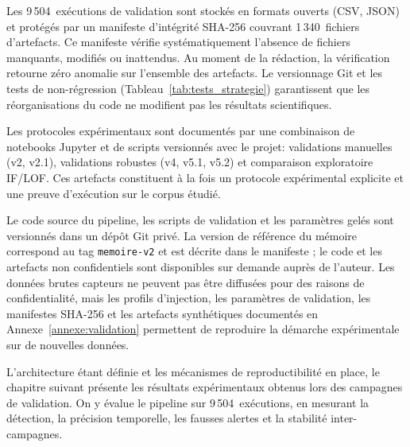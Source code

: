 Les 9\,504~exécutions de validation sont stockés en formats ouverts (CSV, JSON) et
protégés par un manifeste d'intégrité SHA-256 couvrant 1\,340~fichiers d'artefacts. Ce
manifeste vérifie systématiquement l'absence de fichiers manquants, modifiés ou
inattendus. Au moment de la rédaction, la vérification retourne zéro anomalie sur
l'ensemble des artefacts. Le versionnage Git et les tests de non-régression
(Tableau~\ref{tab:tests_strategie}) garantissent que les réorganisations du code ne
modifient pas les résultats scientifiques.

Les protocoles expérimentaux sont documentés par une combinaison de notebooks Jupyter et
de scripts versionnés avec le projet: validations manuelles (v2, v2.1), validations
robustes (v4, v5.1, v5.2) et comparaison exploratoire IF/LOF. Ces artefacts constituent
à la fois un protocole expérimental explicite et une preuve d'exécution sur le corpus
étudié.

Le code source du pipeline, les scripts de validation et les paramètres gelés sont
versionnés dans un dépôt Git privé. La version de référence du mémoire correspond au
tag \texttt{memoire-v2} et est décrite dans le manifeste
 ; le code et les artefacts non
confidentiels sont disponibles sur demande auprès de l'auteur. Les données brutes
capteurs ne peuvent pas être diffusées pour des raisons de confidentialité, mais les
profils d'injection, les paramètres de validation, les manifestes SHA-256 et les artefacts
synthétiques documentés en Annexe~\ref{annexe:validation} permettent de reproduire la
démarche expérimentale sur de nouvelles données.

\vspace{0.5em}
\noindent
L'architecture étant définie et les mécanismes de reproductibilité en place, le chapitre
suivant présente les résultats expérimentaux obtenus lors des campagnes de validation. On y
évalue le pipeline sur 9\,504~exécutions, en mesurant la détection, la précision
temporelle, les fausses alertes et la stabilité inter-campagnes.
